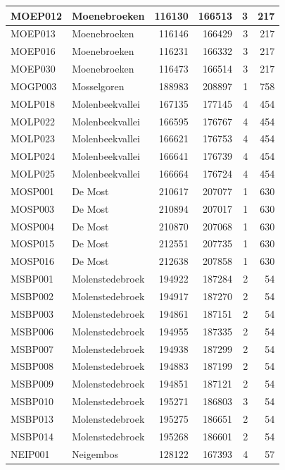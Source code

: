 \documentclass[11pt,]{book}
\begin{document}
\begin{table}
\begin{tabular}[t]{l|l|r|r|r|r}
MOEP012 & Moenebroeken & 116130 & 166513 & 3 & 217\\
\hline
MOEP013 & Moenebroeken & 116146 & 166429 & 3 & 217\\
\hline
MOEP016 & Moenebroeken & 116231 & 166332 & 3 & 217\\
\hline
MOEP030 & Moenebroeken & 116473 & 166514 & 3 & 217\\
\hline
MOGP003 & Mosselgoren & 188983 & 208897 & 1 & 758\\
\hline
MOLP018 & Molenbeekvallei & 167135 & 177145 & 4 & 454\\
\hline
MOLP022 & Molenbeekvallei & 166595 & 176767 & 4 & 454\\
\hline
MOLP023 & Molenbeekvallei & 166621 & 176753 & 4 & 454\\
\hline
MOLP024 & Molenbeekvallei & 166641 & 176739 & 4 & 454\\
\hline
MOLP025 & Molenbeekvallei & 166664 & 176724 & 4 & 454\\
\hline
MOSP001 & De Most & 210617 & 207077 & 1 & 630\\
\hline
MOSP003 & De Most & 210894 & 207017 & 1 & 630\\
\hline
MOSP004 & De Most & 210870 & 207068 & 1 & 630\\
\hline
MOSP015 & De Most & 212551 & 207735 & 1 & 630\\
\hline
MOSP016 & De Most & 212638 & 207858 & 1 & 630\\
\hline
MSBP001 & Molenstedebroek & 194922 & 187284 & 2 & 54\\
\hline
MSBP002 & Molenstedebroek & 194917 & 187270 & 2 & 54\\
\hline
MSBP003 & Molenstedebroek & 194861 & 187151 & 2 & 54\\
\hline
MSBP006 & Molenstedebroek & 194955 & 187335 & 2 & 54\\
\hline
MSBP007 & Molenstedebroek & 194938 & 187299 & 2 & 54\\
\hline
MSBP008 & Molenstedebroek & 194883 & 187199 & 2 & 54\\
\hline
MSBP009 & Molenstedebroek & 194851 & 187121 & 2 & 54\\
\hline
MSBP010 & Molenstedebroek & 195271 & 186803 & 3 & 54\\
\hline
MSBP013 & Molenstedebroek & 195275 & 186651 & 2 & 54\\
\hline
MSBP014 & Molenstedebroek & 195268 & 186601 & 2 & 54\\
\hline
NEIP001 & Neigembos & 128122 & 167393 & 4 & 57\\
\hline

\end{tabular}
\end{table}
\end{document}
